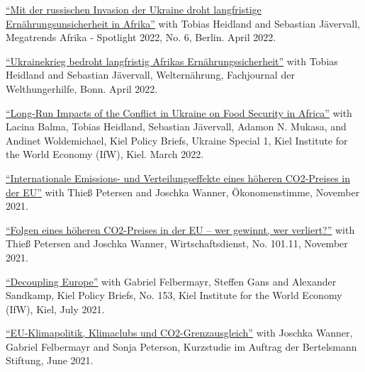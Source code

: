 \documentclass{article}
\begin{document}
\begin{minipage}[t]{0.8\textwidth}
    \href{https://www.megatrends-afrika.de/publikation/mit-der-russischen-invasion-der-ukraine-droht-langfristige-ernaehrungsunsicherheit-in-afrika}{``Mit der russischen Invasion der Ukraine droht langfristige Ernährungsunsicherheit in Afrika''} with Tobias Heidland and Sebastian Jävervall, Megatrends Afrika - Spotlight 2022, No. 6, Berlin. April 2022. \par
    \href{https://www.welthungerhilfe.de/welternaehrung/rubriken/agrar-ernaehrungspolitik/wie-der-ukrainekrieg-afrikas-brotversorgung-trifft/}{``Ukrainekrieg bedroht langfristig Afrikas Ernährungssicherheit''} with Tobias Heidland and Sebastian Jävervall, Welternährung, Fachjournal der Welthungerhilfe, Bonn. April 2022. \par
    \href{https://www.ifw-kiel.de/publications/kiel-policy-brief/ukraine-special/long-run-impacts-of-the-conflict-in-ukraine-on-food-security-in-africa-17165/}{``Long-Run Impacts of the Conflict in Ukraine on Food Security in Africa''} with Lacina Balma, Tobias Heidland, Sebastian Jävervall, Adamon N. Mukasa, and Andinet Woldemichael, Kiel Policy Briefs, Ukraine Special 1, Kiel Institute for the World Economy (IfW), Kiel. March 2022. \par
    \href{https://www.oekonomenstimme.org/artikel/2021/11/internationale-emissions--und-verteilungseffekte-eines-hoeheren-co2-preises-in-der-eu/}{``Internationale Emissions- und Verteilungseffekte eines höheren CO2-Preises in der EU''} with Thieß Petersen and Joschka Wanner, Ökonomenstimme, November 2021. \par
    \href{https://www.wirtschaftsdienst.eu/inhalt/jahr/2021/heft/11/beitrag/folgen-eines-hoeheren-co2-preises-in-der-eu-wer-gewinnt-wer-verliert.html}{``Folgen eines höheren CO2-Preises in der EU – wer gewinnt, wer verliert?''} with Thieß Petersen and Joschka Wanner, Wirtschaftsdienst, No. 101.11, November 2021. \par
    \href{https://www.ifw-kiel.de/publications/kiel-policy-briefs/2021/decoupling-europe-16271/}{``Decoupling Europe''} with Gabriel Felbermayr, Steffen Gans and Alexander Sandkamp, Kiel Policy Briefs, No. 153, Kiel Institute for the World Economy (IfW), Kiel, July 2021. \par
    \href{https://www.bertelsmann-stiftung.de/de/publikationen/publikation/did/eu-klimapolitik-klimaclubs-und-co2-grenzausgleich}{``EU-Klimapolitik, Klimaclubs und CO2-Grenzausgleich''} with Joschka Wanner, Gabriel Felbermayr and Sonja Peterson, Kurzstudie im Auftrag der Bertelsmann Stiftung, June 2021. \par

\end{minipage}
\end{document}
